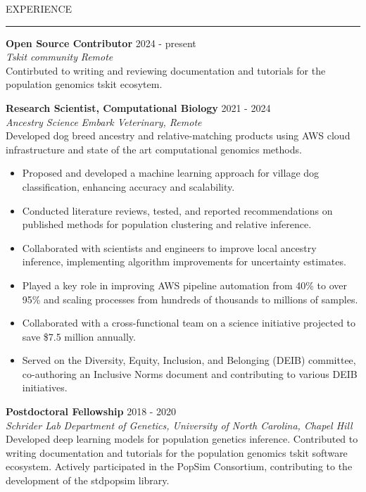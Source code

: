 \documentclass{resume} %
\renewenvironment{rSection}[1]{
\sectionskip
\textcolor{RoyalPurple}{\MakeUppercase{#1}}
\sectionlineskip
\hrule
\begin{list}{}{
\setlength{\leftmargin}{1.5em}
}
\item[]
}{
\end{list}
}
\begin{document}
\begin{rSection}{Experience}

{\bf Open Source Contributor} \hfill  2024 - present\\ 
{\em Tskit community} \hfill {\em Remote}\\
Contirbuted to writing and reviewing documentation and tutorials for the population genomics tskit ecosytem.

{\bf Research Scientist, Computational Biology} \hfill  2021 - 2024\\ 
{\em Ancestry Science} \hfill {\em Embark Veterinary, Remote}\\
Developed dog breed ancestry and relative-matching products using AWS cloud infrastructure and state of the art computational genomics methods.
\begin{itemize}[noitemsep, topsep=0pt]
    \item Proposed and developed a machine learning approach for village dog classification, enhancing accuracy and scalability.
    \item Conducted literature reviews, tested, and reported recommendations on published methods for population clustering and relative inference.
    \item Collaborated with scientists and engineers to improve local ancestry inference, implementing algorithm improvements for uncertainty estimates.
    \item Played a key role in improving AWS pipeline automation from 40\% to over 95\% and scaling processes from hundreds of thousands to millions of samples.
    \item Collaborated with a cross-functional team on a science initiative projected to save \$7.5 million annually. 
    \item Served on the Diversity, Equity, Inclusion, and Belonging (DEIB) committee, co-authoring an Inclusive Norms document and contributing to various DEIB initiatives.
\end{itemize}

{\bf Postdoctoral Fellowship} \hfill  2018 - 2020\\ 
{\em Schrider Lab} \hfill {\em Department of Genetics, University of North Carolina, Chapel Hill}\\
Developed deep learning models for population genetics inference. Contributed to writing documentation and tutorials for the population genomics tskit software ecosystem. Actively participated in the PopSim Consortium, contributing to the development of the stdpopsim library.



\end{rSection}
\end{document}
